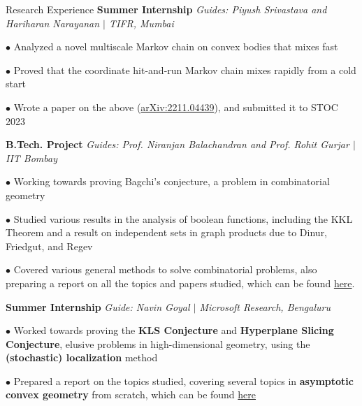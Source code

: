\begin{rubric}{Research Experience}
    \entry*[2022] \textbf{Summer Internship} \hfill \emph{Guides: Piyush Srivastava and Hariharan Narayanan $\mid$ TIFR, Mumbai}

        $\bullet$ Analyzed a novel multiscale Markov chain on convex bodies that mixes fast

        $\bullet$ Proved that the coordinate hit-and-run Markov chain mixes rapidly from a cold start

        $\bullet$ Wrote a paper on the above (\href{https://arxiv.org/abs/2211.04439}{arXiv:2211.04439}), and submitted it to STOC 2023

    \entry*[\phantom{.}2022] \textbf{B.Tech. Project} \hfill \emph{Guides: Prof. Niranjan Balachandran and Prof. Rohit Gurjar $\mid$ IIT Bombay}

        $\bullet$ Working towards proving Bagchi's conjecture, a problem in combinatorial geometry

        $\bullet$ Studied various results in the analysis of boolean functions, including the KKL Theorem and a result on independent sets in graph products due to Dinur, Friedgut, and Regev

        $\bullet$ Covered various general methods to solve combinatorial problems, also preparing a report on all the topics and papers studied, which can be found \href{https://amitrajaraman.github.io/research/pls/btp1-report.pdf}{here}.
    
    \entry*[2021] \textbf{Summer Internship} \hfill \emph{Guide: Navin Goyal $\mid$ Microsoft Research, Bengaluru}
        
        $\bullet$ Worked towards proving the \textbf{KLS Conjecture} and \textbf{Hyperplane Slicing Conjecture}, elusive problems in high-dimensional geometry, using the \textbf{(stochastic) localization} method

        $\bullet$ Prepared a report on the topics studied, covering several topics in \textbf{asymptotic convex geometry} from scratch, which can be found \href{https://amitrajaraman.github.io/notes/convex-geometry/main.pdf}{here}

\end{rubric}